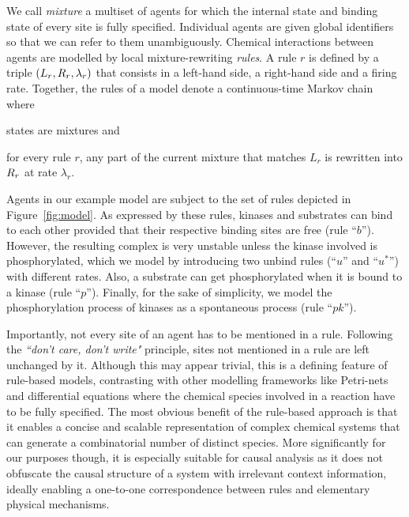 We call \emph{mixture} a multiset of agents for which the internal
state and binding state of every site is fully specified.  Individual
agents are given global identifiers so that we can refer to them
unambiguously. 
\noindent
Chemical interactions between agents are modelled by local
mixture-rewriting \emph{rules}.  A rule $r$ is defined by a triple
$(L_{r}, R_{r}, \lambda_r)$ that consists in a left-hand side, a
right-hand side and a firing rate.  Together, the rules of a model
denote a continuous-time Markov chain where
\begin{inparaenum}[(i)]
\item states are mixtures and
\item for every rule $r$, any part of the current mixture that matches
  $L_r$ is rewritten into $R_{r}$ at rate $\lambda_r$.
\end{inparaenum}
Agents in our example model are subject to the set of rules depicted
in Figure~\ref{fig:model}. As expressed by these rules, kinases and
substrates can bind to each other provided that their respective
binding sites are free (rule ``$b$''). However, the resulting complex
is very unstable unless the kinase involved is phosphorylated, which
we model by introducing two unbind rules (``$u$'' and ``$u^{*}$'')
with different rates. Also, a substrate can get phosphorylated when it
is bound to a kinase (rule ``$p$''). Finally, for the sake of
simplicity, we model the phosphorylation process of kinases as a
spontaneous process (rule ``$pk$'').



Importantly, not every site of an agent has to be mentioned in a rule.
Following the \textit{``don't care, don't write"} principle, sites not
mentioned in a rule are left unchanged by it. Although this may appear
trivial, this is a defining feature of rule-based models, contrasting
with other modelling frameworks %
like Petri-nets and differential equations where the chemical species
involved in a reaction have to be fully specified. The most obvious
benefit of the rule-based approach is that it enables a concise and
scalable representation of complex chemical systems that can generate
a combinatorial number of distinct species. More significantly for our
purposes though, it is especially suitable for causal analysis as it
does not obfuscate the causal structure of a system with irrelevant
context information, ideally enabling a one-to-one correspondence
between rules and elementary physical mechanisms.

